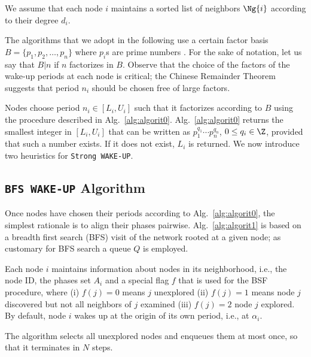 We assume that each node $i$ maintains a sorted list of neighbors $\Ng{i}$ according to their degree $d_i$. 


The algorithms that we adopt in the following use a certain factor basis $B=\{p_1,p_2,\ldots,p_n\}$ where $p_i$s are 
prime numbers \cite{koblitz}. For the sake of notation, let us say that $B|n$ if $n$ factorizes in $B$. Observe that the choice of the factors of the wake-up periods at each node is critical; the Chinese Remainder 
Theorem suggests that period $n_i$ should be chosen free of large factors. 




Nodes choose period $n_i\in [L_i,U_i]$ such that it factorizes according to $B$ using the procedure described 
in Alg.~\ref{alg:algorit0}. Alg.~\ref{alg:algorit0} returns the smallest integer in $[L_i,U_i]$ that can be written 
as $p_1^{q_1}\cdots p_n^{q_n}$, $0\leq q_i\in \Z$, provided that such a number exists. If it does not exist, $L_i$
is returned. We now introduce two heuristics for {\tt Strong WAKE-UP}.


\subsection{{\tt BFS WAKE-UP} Algorithm}\label{sec:equential}


Once nodes have chosen their periods according to Alg.~\ref{alg:algorit0}, the simplest rationale is 
to align their phases pairwise. Alg.~\ref{alg:algorit1} is based on a breadth first 
search (BFS) visit of the network rooted at a given node; as customary for BFS search 
a queue $Q$ is employed.  

Each node $i$ maintains information about nodes in its neighborhood, i.e., the node ID, the phases 
set $A_{i}$ and a special flag $f$ that is used for the BSF procedure, where (i) $f(j)=0$ means $j$ 
unexplored (ii) $f(j)=1$ means node $j$ discovered but not all neighbors of $j$ examined (iii) $f(j)=2$ 
node $j$ explored. By 
default, node $i$ wakes up at the origin of its own period, i.e., at $\alpha_i$. 



The algorithm selects all unexplored nodes and enqueues them at most once, so that it terminates in $N$ steps. 

